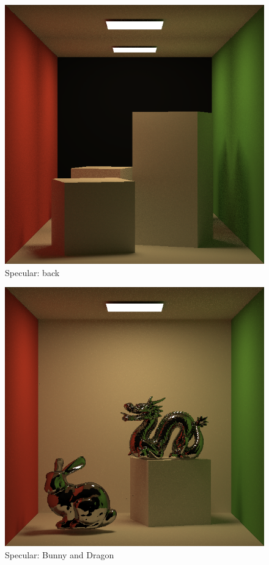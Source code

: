 \documentclass[acmtog]{acmart}
\begin{document}
\begin{figure}[h]
	\centering
	\includegraphics[width=0.7\linewidth]{Specular_back_900sample.png}
	\caption{Specular: back}
	\label{fig:BVH}
\end{figure}
\begin{figure}[h]
	\centering
	\includegraphics[width=0.7\linewidth]{Specular_bunnydragon.png}
	\caption{Specular: Bunny and Dragon}
	\label{fig:BVH}
\end{figure}
\end{document}
